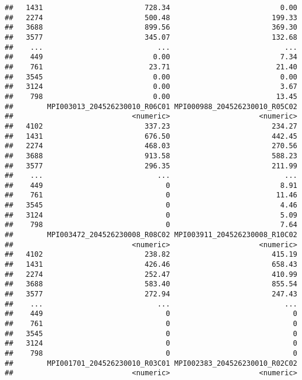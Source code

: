 \documentclass[
]{article}
\begin{document}
\begin{verbatim}
##   1431                        728.34                          0.00
##   2274                        500.48                        199.33
##   3688                        899.56                        369.30
##   3577                        345.07                        132.68
##    ...                           ...                           ...
##    449                          0.00                          7.34
##    761                         23.71                         21.40
##   3545                          0.00                          0.00
##   3124                          0.00                          3.67
##    798                          0.00                         13.45
##        MPI003013_204526230010_R06C01 MPI000988_204526230010_R05C02
##                            <numeric>                     <numeric>
##   4102                        337.23                        234.27
##   1431                        676.50                        442.45
##   2274                        468.03                        270.56
##   3688                        913.58                        588.23
##   3577                        296.35                        211.99
##    ...                           ...                           ...
##    449                             0                          8.91
##    761                             0                         11.46
##   3545                             0                          4.46
##   3124                             0                          5.09
##    798                             0                          7.64
##        MPI003472_204526230008_R08C02 MPI003911_204526230008_R10C02
##                            <numeric>                     <numeric>
##   4102                        238.82                        415.19
##   1431                        426.46                        658.43
##   2274                        252.47                        410.99
##   3688                        583.40                        855.54
##   3577                        272.94                        247.43
##    ...                           ...                           ...
##    449                             0                             0
##    761                             0                             0
##   3545                             0                             0
##   3124                             0                             0
##    798                             0                             0
##        MPI001701_204526230010_R03C01 MPI002383_204526230010_R02C02
##                            <numeric>                     <numeric>

\end{verbatim}
\end{document}
